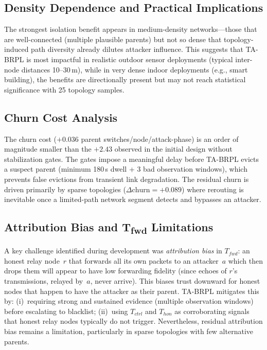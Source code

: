 \documentclass[conference]{IEEEtran}
\begin{document}
\subsection{Density Dependence and Practical Implications}

The strongest isolation benefit appears in medium-density networks---those
that are well-connected (multiple plausible parents) but not so dense
that topology-induced path diversity already dilutes attacker influence.
This suggests that TA-BRPL is most impactful in realistic
outdoor sensor deployments (typical inter-node distances 10--30\,m),
while in very dense indoor deployments (e.g., smart building), the benefits
are directionally present but may not reach statistical significance
with 25 topology samples.

\subsection{Churn Cost Analysis}

The churn cost ($+0.036$ parent switches/node/attack-phase)
is an order of magnitude smaller than the $+2.43$ observed in the
initial design without stabilization gates.
The gates impose a meaningful delay before TA-BRPL evicts a suspect parent
(minimum 180\,s dwell + 3 bad observation windows),
which prevents false evictions from transient link degradation.
The residual churn is driven primarily by sparse topologies
($\Delta\text{churn} = +0.089$) where rerouting is inevitable
once a limited-path network segment detects and bypasses an attacker.

\subsection{Attribution Bias and T\textsubscript{fwd} Limitations}

A key challenge identified during development was \emph{attribution bias}
in $T_{fwd}$: an honest relay node~$r$ that forwards all its own packets
to an attacker~$a$ which then drops them will appear to have low forwarding
fidelity (since echoes of $r$'s transmissions, relayed by~$a$, never arrive).
This biases trust downward for honest nodes that happen to have the
attacker as their parent.
TA-BRPL mitigates this by: (i)~requiring strong and sustained evidence
(multiple observation windows) before escalating to blacklist;
(ii)~using $T_{ctrl}$ and $T_{hon}$ as corroborating signals
that honest relay nodes typically do not trigger.
Nevertheless, residual attribution bias remains a limitation,
particularly in sparse topologies with few alternative parents.
\end{document}

